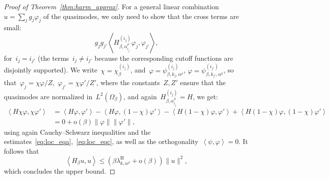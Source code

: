 \documentclass[10pt]{article}
\newcommand{\1}{\mathbbm 1}
\newcommand{\shift}{\rho} %
\begin{document}
\begin{proof}[Proof of Theorem~\ref{thm:harm_approx}]
        For a general linear combination~$u = \sum_j g_j \varphi_j$ of the quasimodes, we only need to show that the cross terms are small:
        \[g_jg_{j'}\left\langle H_{\beta,\alpha_{i_j}^\shift}^{(i_j)}\varphi_j,\varphi_{j'}\right\rangle,\]
        for~$i_j = i_{j'}$ (the terms~$i_j \neq i_{j'}$ because the corresponding cutoff functions are disjointly supported).
        We write~$\chi = \chi_\beta^{(i_j)}$, and~$\varphi = \psi^{(i_j)}_{\beta,k_j,\alpha^\shift}$, $\varphi = \psi^{(i_{j'})}_{\beta,k_{j'},\alpha^\shift}$, so that~$\varphi_j = \chi \varphi/Z$,~$\varphi_{j'} = \chi\varphi'/Z'$, where the constants~$Z,Z'$ ensure that the quasimodes are normalized in~$L^2(\Omega_\beta)$, and again~$H_{\beta,\alpha_{i_j}^\shift}^{(i_j)}=H$, we get:
        \[\begin{aligned}
            \left\langle H\chi\varphi,\chi\varphi'\right\rangle &= \left\langle H\varphi,\varphi'\right\rangle - \left\langle H\varphi,(1-\chi)\varphi'\right\rangle - \left\langle H(1-\chi)\varphi,\varphi'\right\rangle + \left\langle H(1-\chi)\varphi,(1-\chi)\varphi'\right\rangle\\
            &= 0 + \mathrm{o}(\beta)\|\varphi\|\|\varphi'\|,
        \end{aligned}
        \]
        using again Cauchy--Schwarz inequalities and the estimates~\eqref{eq:loc_eqa},~\eqref{eq:loc_eqc}, as well as the orthogonality~$\left\langle \psi,\varphi\right\rangle = 0$.
        It follows that 
        \[\left\langle H_\beta u,u\right\rangle \leq (\beta\lambda_{k,\alpha^\shift}^{\mathrm H}+\mathrm{o}(\beta))\|u\|^2,\]
        which concludes the upper bound.


\end{proof}
\end{document}
